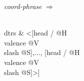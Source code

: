 \documentclass{standalone}
\begin{document}
\textit{coord-phrase} $\Rightarrow$
\begin{avm}
[synsem & [head / @H\\
						 valence @V\\
						 slash @S]\\
 dtrs & <[head / @H\\
					valence @V\\
					slash @S],...,
					[head / @H\\
					valence @V\\
					slash @S]>]
\end{avm}
\end{document}
